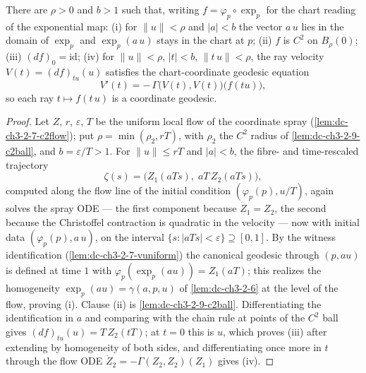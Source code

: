\begin{lemma}
  \label{lem:dc-ch3-3-5-rayode}
  \leanok
  There are $\rho > 0$ and $b > 1$ such that, writing
  $f = \varphi_p \circ \exp_p$ for the chart reading of the exponential map:
  (i) for $\|u\| < \rho$ and $|a| < b$ the vector $a\,u$ lies in the domain of
  $\exp_p$ and $\exp_p(a\,u)$ stays in the chart at $p$;
  (ii) $f$ is $C^2$ on $B_\rho(0)$;
  (iii) $(df)_0 = \mathrm{id}$;
  (iv) for $\|u\| < \rho$, $|t| < b$, $\|t\,u\| < \rho$, the ray velocity
  $V(t) = (df)_{tu}(u)$ satisfies the chart-coordinate geodesic equation
  $$V'(t) = -\,\Gamma\big(V(t), V(t)\big)\big(f(tu)\big),$$
  so each ray $t \mapsto f(t\,u)$ is a coordinate geodesic.
\end{lemma}
\begin{proof}
  \sketch
  \leanok
  Let $Z$, $r$, $\varepsilon$, $T$ be the uniform local flow of the coordinate
  spray (\cref{lem:dc-ch3-2-7-c2flow}); put
  $\rho = \min(\rho_2, rT)$, with $\rho_2$ the $C^2$ radius of
  \cref{lem:dc-ch3-2-9-c2ball}, and $b = \varepsilon/T > 1$. For
  $\|u\| \le rT$ and $|a| < b$, the fibre- and time-rescaled trajectory
  $$\zeta(s) = \big(Z_1(aTs),\; aT\,Z_2(aTs)\big),$$
  computed along the flow line of the initial condition
  $(\varphi_p(p), u/T)$, again solves the spray ODE — the first component
  because $\dot Z_1 = Z_2$, the second because the Christoffel contraction is
  quadratic in the velocity — now with initial data $(\varphi_p(p), a\,u)$,
  on the interval $\{s : |aTs| < \varepsilon\} \supseteq [0,1]$. By the
  witness identification (\cref{lem:dc-ch3-2-7-vuniform}) the canonical
  geodesic through $(p, a u)$ is defined at time $1$ with
  $\varphi_p(\exp_p(a u)) = Z_1(aT)$; this realizes the homogeneity
  $\exp_p(a u) = \gamma(a, p, u)$ of \cref{lem:dc-ch3-2-6} at the level of
  the flow, proving (i). Clause (ii) is \cref{lem:dc-ch3-2-9-c2ball}.
  Differentiating the identification in $a$ and comparing with the chain
  rule at points of the $C^2$ ball gives $(df)_{tu}(u) = T\,Z_2(tT)$; at
  $t = 0$ this is $u$, which proves (iii) after extending by homogeneity of
  both sides, and differentiating once more in $t$ through the flow ODE
  $\dot Z_2 = -\Gamma(Z_2, Z_2)(Z_1)$ gives (iv).
\end{proof}

